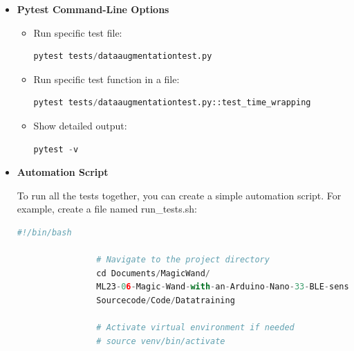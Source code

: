 			\begin{itemize}
				
				\item \textbf{Pytest Command-Line Options}
				
				\begin{itemize}
					
					\item Run specific test file:
				
					\begin{lstlisting}[language=Python, caption={Running a Test for Data Augmentation with Pytest}, label={code:run-dataaugmentation-test}, style=pythonstyle]
						pytest tests/dataaugmentationtest.py
					\end{lstlisting}
					
					\item Run specific test function in a file:
				
					\begin{lstlisting}[language=Python, caption={Running a Specific Test with Pytest}, label={code:run-specific-test}, style=pythonstyle]
						pytest tests/dataaugmentationtest.py::test_time_wrapping
					\end{lstlisting}
					
					\item Show detailed output:
					
				\begin{lstlisting}[language=Python, caption={Running Pytest with Verbose Output}, label={code:run-pytest-verbose}, style=pythonstyle]
					pytest -v
				\end{lstlisting}
				
			
				\end{itemize}
		
				\item \textbf{Automation Script}
				
				To run all the tests together, you can create a simple automation script. For example, create a file named run\_tests.sh:
				
			\begin{lstlisting}[language=Python, caption={Bash Script for Running Pytest in a Specific Directory}, label={code:run-pytest-bash}, style=pythonstyle]
				#!/bin/bash
				
				# Navigate to the project directory
				cd Documents/MagicWand/
				ML23-06-Magic-Wand-with-an-Arduino-Nano-33-BLE-sense/
				Sourcecode/Code/Datatraining
				
				# Activate virtual environment if needed
				# source venv/bin/activate
				

\end{lstlisting}
\end{itemize}
